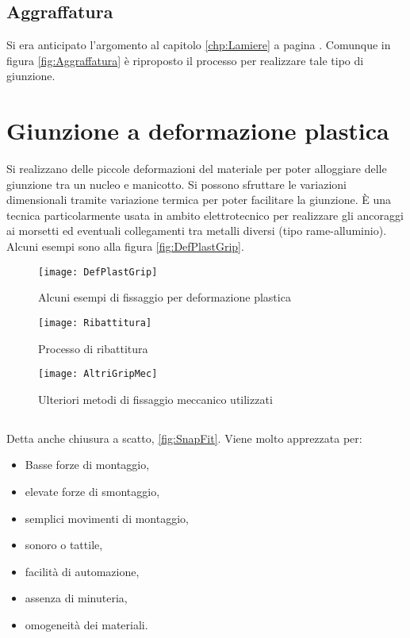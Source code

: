 \subsection{Aggraffatura}
Si era anticipato l'argomento al capitolo \ref{chp:Lamiere} a pagina \pageref{chp:Lamiere}.
Comunque in figura \ref{fig:Aggraffatura} è riproposto il processo per realizzare tale tipo di giunzione.

\section{Giunzione a deformazione plastica}
Si realizzano delle piccole deformazioni del materiale per poter alloggiare delle giunzione tra un nucleo e manicotto.
Si possono sfruttare le variazioni dimensionali tramite variazione termica per poter facilitare la giunzione.
È una tecnica particolarmente usata in ambito elettrotecnico per realizzare gli ancoraggi ai morsetti ed eventuali collegamenti tra metalli diversi (tipo rame-alluminio).
Alcuni esempi sono alla figura \ref{fig:DefPlastGrip}.

\begin{figure}
\centering
\texttt{[image: DefPlastGrip]}
\caption{Alcuni esempi di fissaggio per deformazione plastica}
\label{fig:DefPlastGrip}
\texttt{[image: Ribattitura]}
\caption{Processo di ribattitura}
\label{fig:Ribattitura}
\texttt{[image: AltriGripMec]}
\caption{Ulteriori metodi di fissaggio meccanico utilizzati}
\label{fig:AltriGripMec}
\end{figure}

\subsection{}
Detta anche chiusura a scatto, \ref{fig:SnapFit}. Viene molto apprezzata per:
\begin{itemize}
\item Basse forze di montaggio,
\item elevate forze di smontaggio,
\item semplici movimenti di montaggio,
\item {} sonoro o tattile,
\item facilità di automazione,
\item assenza di minuteria,
\item omogeneità dei materiali.
\end{itemize}

